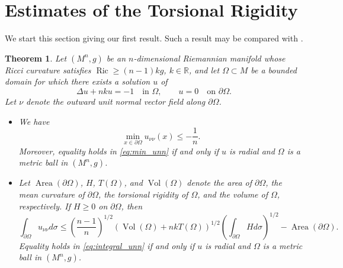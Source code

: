 \documentclass[reqno,11pt]{amsart}
\numberwithin{equation}{section}  %
\newtheorem{theorem}{Theorem}[section]
\begin{document}

\section{Estimates of the Torsional Rigidity}\label{sec_estimates}

We start this section giving our first result. Such a result may be compared with \cite[Theorem 1.6]{wang2020}.

\begin{theorem}\label{thm:main}
Let $(M^n,g)$ be an $n$-dimensional Riemannian manifold whose Ricci curvature satisfies $\operatorname{Ric}\geq (n-1)kg$, $k\in\mathbb{R}$, and let $\Omega\subset M$ be a bounded domain for which there exists a solution $u$ of
\begin{equation}\label{eq:main_problem}
\Delta u + nku = -1\quad \text{in } \Omega,\qquad u = 0\quad \text{on } \partial\Omega.
\end{equation}
Let $\nu$ denote the outward unit normal vector field along $\partial\Omega$.

\begin{itemize}
\item[(a)] We have
\begin{equation}\label{eq:min_unn}
\min_{x\in\partial\Omega} u_{\nu\nu}(x)\leq -\frac{1}{n}.
\end{equation}
Moreover, equality holds in \eqref{eq:min_unn} if and only if $u$ is radial and $\Omega$ is a metric ball in $(M^n,g)$.

\item[(b)] Let $\operatorname{Area}(\partial\Omega)$, $H$, $T(\Omega)$, and $\operatorname{Vol}(\Omega)$ denote the area of $\partial\Omega$, the mean curvature of $\partial\Omega$, the torsional rigidity of $\Omega$, and the volume of $\Omega$, respectively. If $H\geq 0$ on $\partial\Omega$, then
\begin{equation}\label{eq:integral_unn}
\int_{\partial\Omega}u_{\nu\nu}d\sigma\leq \left(\frac{n-1}{n}\right)^{1/2}\left(\operatorname{Vol}(\Omega) + nkT(\Omega)\right)^{1/2}\left(\int_{\partial\Omega}Hd\sigma\right)^{1/2} - \operatorname{Area}(\partial\Omega).
\end{equation}
Equality holds in \eqref{eq:integral_unn} if and only if $u$ is radial and $\Omega$ is a metric ball in $(M^n,g)$.
\end{itemize}
\end{theorem}
\end{document}
